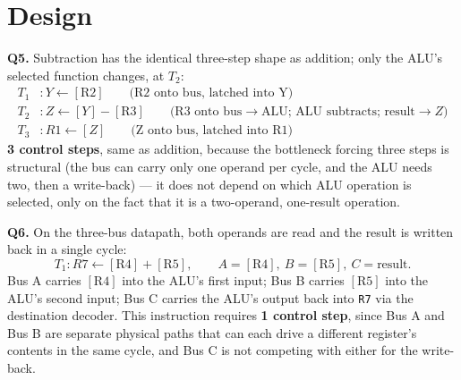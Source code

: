 \documentclass[11pt]{article}
\begin{document}
\section{Design}

\textbf{Q5.} Subtraction has the identical three-step shape as addition; only the ALU's selected function changes, at $T_2$:
\[
\begin{aligned}
T_1&: Y \gets [\text{R2}] \qquad \text{(R2 onto bus, latched into Y)} \\
T_2&: Z \gets [Y] - [\text{R3}] \qquad \text{(R3 onto bus} \to \text{ALU; ALU subtracts; result} \to Z\text{)} \\
T_3&: R1 \gets [Z] \qquad \text{(Z onto bus, latched into R1)}
\end{aligned}
\]
\textbf{3 control steps}, same as addition, because the bottleneck forcing three steps is structural (the bus can carry only one operand per cycle, and the ALU needs two, then a write-back) --- it does not depend on which ALU operation is selected, only on the fact that it is a two-operand, one-result operation.

\textbf{Q6.} On the three-bus datapath, both operands are read and the result is written back in a single cycle:
\[
T_1: R7 \gets [\text{R4}] + [\text{R5}], \qquad A = [\text{R4}], \ B = [\text{R5}], \ C = \text{result}.
\]
Bus A carries $[\text{R4}]$ into the ALU's first input; Bus B carries $[\text{R5}]$ into the ALU's second input; Bus C carries the ALU's output back into \texttt{R7} via the destination decoder. This instruction requires \textbf{1 control step}, since Bus A and Bus B are separate physical paths that can each drive a different register's contents in the same cycle, and Bus C is not competing with either for the write-back.
\end{document}
